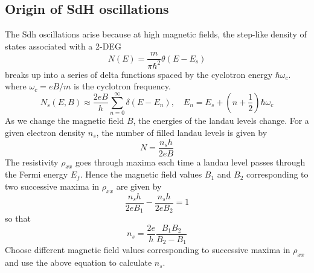 \documentclass[11pt,a4paper]{book}
\theoremstyle{plain}
\theoremstyle{definition}
\theoremstyle{remark}
\begin{document}
\subsection{Origin of SdH oscillations}
The Sdh oscillations arise because at high magnetic fields, the step-like density of states associated with a 2-DEG
\begin{equation}
    N(E) = \frac{m}{\pi \hbar^2} \theta(E - E_s)
\end{equation}
breaks up into a series of delta functions spaced by the cyclotron energy $\hbar \omega_c$. where $\omega_c = e B/m$ is the cyclotron frequency.
\begin{equation}
    N_s(E,B) \approx \frac{2 e B}{h} \sum_{n=0}^{\infty} \delta(E - E_n), \quad E_n = E_s + (n + \frac{1}{2}) \hbar \omega_c
\end{equation}
As we change the magnetic field $B$, the energies of the landau levels change. For a given electron density $n_s$, the number of filled landau levels is given by
\begin{equation}
    N = \frac{n_s h}{2 e B}
\end{equation}
The resistivity $\rho_{xx}$ goes through maxima each time a landau level passes through the Fermi energy $E_f$.  Hence the magnetic field values $B_1$ and $B_2$ corresponding to two successive maxima in $\rho_{xx}$ are given by
\begin{equation}
    \frac{n_s h}{2 e B_1} - \frac{n_s h}{2 e B_2} = 1
\end{equation}
so that
\begin{equation}
    n_s=\frac{2 e}{h} \frac{B_1 B_2}{B_2 - B_1}
\end{equation}
Choose different magnetic field values corresponding to successive maxima in $\rho_{xx}$ and use the above equation to calculate $n_s$.
\end{document}
